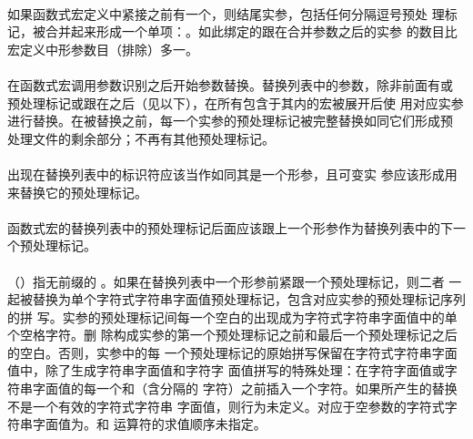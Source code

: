 \paragraph{}
如果函数式宏定义中紧接\tm{)}之前有一个，则结尾实参，包括任何分隔逗号预处
理标记，被合并起来形成一个单项：。如此绑定的跟在合并参数之后的实参
的数目比宏定义中形参数目（排除）多一。

\paragraph{}
在函数式宏调用参数识别之后开始参数替换。替换列表中的参数，除非前面有\tm{\#}或
\tm{\#\#}预处理标记或跟在\tm{\#\#}之后（见以下），在所有包含于其内的宏被展开后使
用对应实参进行替换。在被替换之前，每一个实参的预处理标记被完整替换如同它们形成预
处理文件的剩余部分；不再有其他预处理标记。

\paragraph{}
出现在替换列表中的标识符应该当作如同其是一个形参，且可变实
参应该形成用来替换它的预处理标记。

\paragraph{}
函数式宏的替换列表中的\tm{\#}预处理标记后面应该跟上一个形参作为替换列表中的下一
个预处理标记。

\paragraph{}
（）指无前缀的
。如果在替换列表中一个形参前紧跟一个\tm{\#}预处理标记，则二者
一起被替换为单个字符式字符串字面值预处理标记，包含对应实参的预处理标记序列的拼
写。实参的预处理标记间每一个空白的出现成为字符式字符串字面值中的单个空格字符。删
除构成实参的第一个预处理标记之前和最后一个预处理标记之后的空白。否则，实参中的每
一个预处理标记的原始拼写保留在字符式字符串字面值中，除了生成字符串字面值和字符字
面值拼写的特殊处理：在字符字面值或字符串字面值的每一个和\tm{\bs}（含分隔的
字符）之前插入一个\tm{\bs}字符。如果所产生的替换不是一个有效的字符式字符串
字面值，则行为未定义。对应于空参数的字符式字符串字面值为。\tm{\#}和
\tm{\#\#}运算符的求值顺序未指定。


